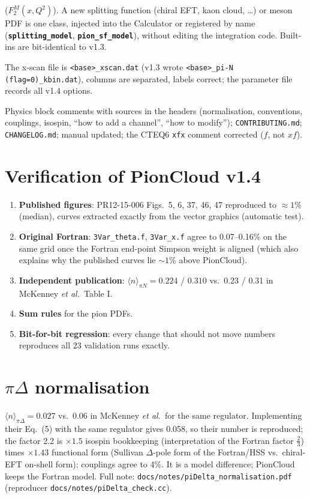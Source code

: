\documentclass[11pt,a4paper]{article}
\newcommand{\picloud}{PionCloud}
\newcommand{\key}[1]{\texttt{\textbf{#1}}}
\begin{document}
\begin{description}
  ($F_2^M(x,Q^2)$).  A new splitting function (chiral EFT, kaon cloud, \dots) or
  meson PDF is one class, injected into the Calculator or registered by name
  (\key{splitting\_model}, \key{pion\_sf\_model}), without editing the
  integration code.  Built-ins are bit-identical to v1.3.
\item[Output.] The x-scan file is \texttt{<base>\_xscan.dat} (v1.3 wrote
  \texttt{<base>\_pi-N (flag=0)\_kbin.dat}), columns are separated, labels
  correct; the parameter file records all v1.4 options.
\item[Documentation.] Physics block comments with sources in the headers
  (normalisation, conventions, couplings, isospin, ``how to add a channel'',
  ``how to modify'');
  \texttt{CONTRIBUTING.md}; \texttt{CHANGELOG.md}; manual updated; the
  CTEQ6 \texttt{xfx} comment corrected ($f$, not $xf$).
\end{description}

\section{Verification of \picloud{} v1.4}
\begin{enumerate}
\item \textbf{Published figures}: PR12-15-006 Figs.~5, 6, 37, 46, 47 reproduced
  to $\approx1\%$ (median), curves extracted exactly from the vector graphics
  (automatic test).
\item \textbf{Original Fortran}: \texttt{3Var\_theta.f}, \texttt{3Var\_x.f}
  agree to 0.07--0.16\% on the same grid once the Fortran end-point Simpson
  weight is aligned (which also explains why the published curves lie
  $\sim1\%$ above \picloud{}).
\item \textbf{Independent publication}: $\langle n\rangle_{\pi N}=0.224$ /
  $0.310$ vs.\ 0.23 / 0.31 in McKenney \textit{et al.}\ Table I.
\item \textbf{Sum rules} for the pion PDFs.
\item \textbf{Bit-for-bit regression}: every change that should not move
  numbers reproduces all 23 validation runs exactly.
\end{enumerate}

\section{$\pi\Delta$ normalisation}
\label{sec:pidelta}
$\langle n\rangle_{\pi\Delta}=0.027$ vs.\ 0.06 in McKenney \textit{et al.}\ for
the same regulator.  Implementing their Eq.~(5) with the same regulator gives
0.058, so their number is reproduced; the factor 2.2 is $\times1.5$ isospin
bookkeeping (interpretation of the Fortran factor $\tfrac23$) times
$\times1.43$ functional form (Sullivan $\Delta$-pole form of the Fortran/HSS
vs.\ chiral-EFT on-shell form); couplings agree to 4\%.  It is a model
difference; \picloud{} keeps the Fortran model.  Full note:
\texttt{docs/notes/piDelta\_normalisation.pdf} (reproducer
\texttt{docs/notes/piDelta\_check.cc}).
\end{document}
